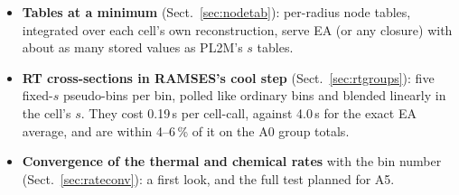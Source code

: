 \documentclass[11pt,a4paper]{article}
\begin{document}
\begin{itemize}
  rate nodes. EAF, PL2M, affine and exponential closures and kernel averaging are selectable; every figure is redrawn
  with EA and PL2M (and EAF where it differs).
\item \textbf{Tables at a minimum} (Sect.~\ref{sec:nodetab}): per-radius node tables, integrated over each cell's own
  reconstruction, serve EA (or any closure) with about as many stored values as PL2M's $s$ tables.
\item \textbf{RT cross-sections in RAMSES's cool step} (Sect.~\ref{sec:rtgroups}): five fixed-$s$ pseudo-bins per bin,
  polled like ordinary bins and blended linearly in the cell's $s$. They cost 0.19\,\textmu s per cell-call, against
  4.0\,\textmu s for the exact EA average, and are within 4--6\,\% of it on the A0 group totals.
\item \textbf{Convergence of the thermal and chemical rates} with the bin number (Sect.~\ref{sec:rateconv}): a first
  look, and the full test planned for A5.
\end{itemize}
\end{document}
